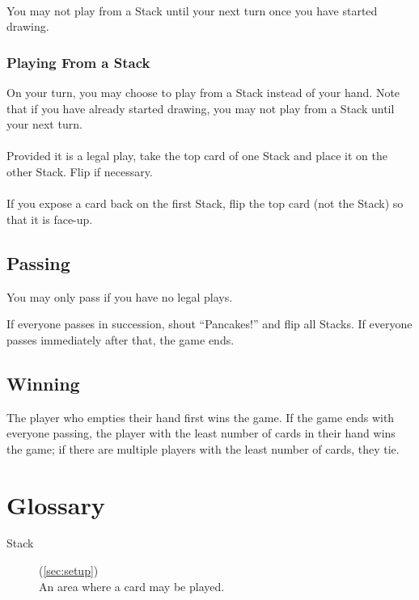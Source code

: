 \documentclass{article}
\begin{document}
\paragraph{}
You may not play from a Stack until your next turn once you have started drawing.

\subsubsection{Playing From a Stack}
\label{sec:fromstack}

On your turn, you may choose to play from a Stack instead of your hand. Note that if you have already started drawing, you may not play from a Stack until your next turn.

\paragraph{}
Provided it is a legal play, take the top card of one Stack and place it on the other Stack. Flip if necessary.

\paragraph{}
If you expose a card back on the first Stack, flip the top card (not the Stack) so that it is face-up.

\subsection{Passing}

You may only pass if you have no legal plays.

If everyone passes in succession, shout ``Pancakes!'' and flip all Stacks. If everyone passes immediately after that, the game ends.

\subsection{Winning}

The player who empties their hand first wins the game. If the game ends with everyone passing, the player with the least number of cards in their hand wins the game; if there are multiple players with the least number of cards, they tie.

\section{Glossary}
\begin{description}
  \item[Stack] (\autoref{sec:setup})\\
    An area where a card may be played.
\end{description}
\end{document}
